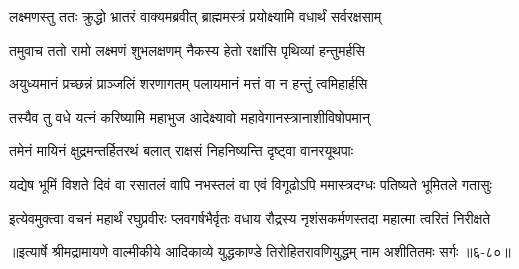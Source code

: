 \twolineshloka
{लक्ष्मणस्तु ततः क्रुद्धो भ्रातरं वाक्यमब्रवीत्}
{ब्राह्ममस्त्रं प्रयोक्ष्यामि वधार्थं सर्वरक्षसाम्} %

\twolineshloka
{तमुवाच ततो रामो लक्ष्मणं शुभलक्षणम्}
{नैकस्य हेतो रक्षांसि पृथिव्यां हन्तुमर्हसि} %

\twolineshloka
{अयुध्यमानं प्रच्छन्नं प्राञ्जलिं शरणागतम्}
{पलायमानं मत्तं वा न हन्तुं त्वमिहार्हसि} %

\twolineshloka
{तस्यैव तु वधे यत्नं करिष्यामि महाभुज}
{आदेक्ष्यावो महावेगानस्त्रानाशीविषोपमान्} %

\twolineshloka
{तमेनं मायिनं क्षुद्रमन्तर्हितरथं बलात्}
{राक्षसं निहनिष्यन्ति दृष्ट्वा वानरयूथपाः} %

\twolineshloka
{यद्येष भूमिं विशते दिवं वा रसातलं वापि नभस्तलं वा}
{एवं विगूढोऽपि ममास्त्रदग्धः पतिष्यते भूमितले गतासुः} %

\twolineshloka
{इत्येवमुक्त्वा वचनं महार्थं रघुप्रवीरः प्लवगर्षभैर्वृतः}
{वधाय रौद्रस्य नृशंसकर्मणस्तदा महात्मा त्वरितं निरीक्षते} %


॥इत्यार्षे श्रीमद्रामायणे वाल्मीकीये आदिकाव्ये युद्धकाण्डे तिरोहितरावणियुद्धम् नाम अशीतितमः सर्गः ॥६-८०॥
